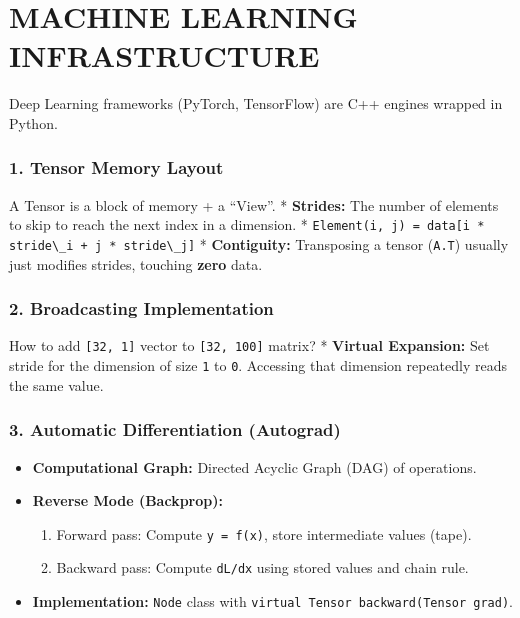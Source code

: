 \hypertarget{machine-learning-infrastructure}{%
\chapter{MACHINE LEARNING
INFRASTRUCTURE}\label{machine-learning-infrastructure}}

Deep Learning frameworks (PyTorch, TensorFlow) are C++ engines wrapped
in Python.

\hypertarget{tensor-memory-layout}{%
\subsection{1. Tensor Memory Layout}\label{tensor-memory-layout}}

A Tensor is a block of memory + a ``View''. * \textbf{Strides:} The
number of elements to skip to reach the next index in a dimension. *
\passthrough{\lstinline!Element(i, j) = data[i * stride\_i + j * stride\_j]!}
* \textbf{Contiguity:} Transposing a tensor
(\passthrough{\lstinline!A.T!}) usually just modifies strides, touching
\textbf{zero} data.

\hypertarget{broadcasting-implementation}{%
\subsection{2. Broadcasting
Implementation}\label{broadcasting-implementation}}

How to add \passthrough{\lstinline![32, 1]!} vector to
\passthrough{\lstinline![32, 100]!} matrix? * \textbf{Virtual
Expansion:} Set stride for the dimension of size
\passthrough{\lstinline!1!} to \passthrough{\lstinline!0!}. Accessing
that dimension repeatedly reads the same value.

\hypertarget{automatic-differentiation-autograd}{%
\subsection{3. Automatic Differentiation
(Autograd)}\label{automatic-differentiation-autograd}}

\begin{itemize}
\tightlist
\item
  \textbf{Computational Graph:} Directed Acyclic Graph (DAG) of
  operations.
\item
  \textbf{Reverse Mode (Backprop):}

  \begin{enumerate}
  \def\labelenumi{\arabic{enumi}.}
  \tightlist
  \item
    Forward pass: Compute \passthrough{\lstinline!y = f(x)!}, store
    intermediate values (tape).
  \item
    Backward pass: Compute \passthrough{\lstinline!dL/dx!} using stored
    values and chain rule.
  \end{enumerate}
\item
  \textbf{Implementation:} \passthrough{\lstinline!Node!} class with
  \passthrough{\lstinline!virtual Tensor backward(Tensor grad)!}.
\end{itemize}

